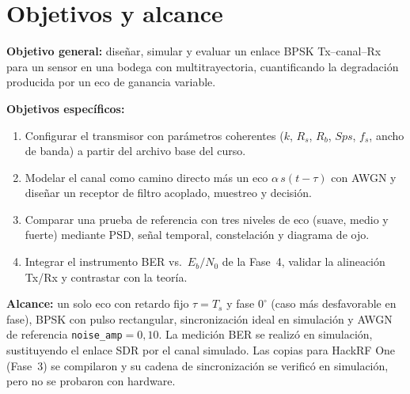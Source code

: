\section{Objetivos y alcance}

\textbf{Objetivo general:} diseñar, simular y evaluar un enlace BPSK Tx--canal--Rx para un sensor en una bodega con multitrayectoria, cuantificando la degradación producida por un eco de ganancia variable.

\textbf{Objetivos específicos:}
\begin{enumerate}
    \item Configurar el transmisor con parámetros coherentes ($k$, $R_s$, $R_b$, $Sps$, $f_s$, ancho de banda) a partir del archivo base del curso.
    \item Modelar el canal como camino directo más un eco $\alpha\,s(t-\tau)$ con AWGN y diseñar un receptor de filtro acoplado, muestreo y decisión.
    \item Comparar una prueba de referencia con tres niveles de eco (suave, medio y fuerte) mediante PSD, señal temporal, constelación y diagrama de ojo.
    \item Integrar el instrumento BER vs.\ $E_b/N_0$ de la Fase~4, validar la alineación Tx/Rx y contrastar con la teoría.
\end{enumerate}

\textbf{Alcance:} un solo eco con retardo fijo $\tau=T_s$ y fase $0^\circ$ (caso más desfavorable en fase), BPSK con pulso rectangular, sincronización ideal en simulación y AWGN de referencia \texttt{noise\_amp}$=0{,}10$. La medición BER se realizó en simulación, sustituyendo el enlace SDR por el canal simulado. Las copias para HackRF One (Fase~3) se compilaron y su cadena de sincronización se verificó en simulación, pero no se probaron con hardware.
